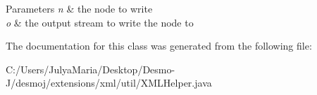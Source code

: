 \begin{DoxyParams}{Parameters}
{\em n} & the node to write \\
\hline
{\em o} & the output stream to write the node to \\
\hline
\end{DoxyParams}


The documentation for this class was generated from the following file\-:\begin{DoxyCompactItemize}
\item 
C\-:/\-Users/\-Julya\-Maria/\-Desktop/\-Desmo-\/\-J/desmoj/extensions/xml/util/X\-M\-L\-Helper.\-java\end{DoxyCompactItemize}
